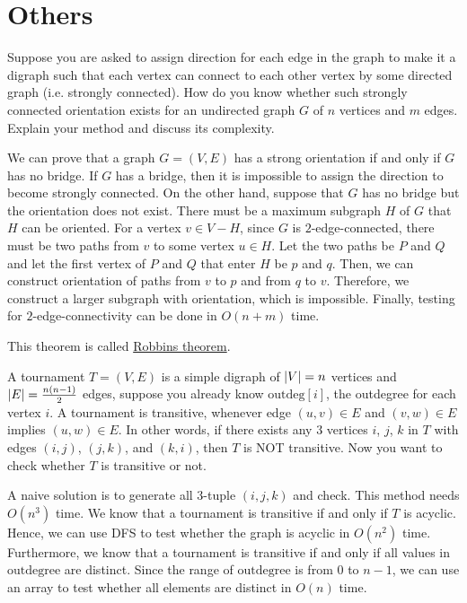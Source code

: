 \section{Others}
\begin{Exercise}[title={Strong orientation},origin={NCKU IM 99}]
Suppose you are asked to assign direction for each edge in the graph to make it a digraph such that each vertex can connect to each other vertex by some directed graph (i.e. strongly connected). How do you know whether such strongly connected orientation exists for an undirected graph $G$ of $n$ vertices and $m$ edges. Explain your method and discuss its complexity.
\end{Exercise}
\begin{Answer}
We can prove that a graph $G = (V, E)$ has a strong orientation if and only if $G$ has no bridge. If $G$ has a bridge, then it is impossible to assign the direction to become strongly connected. On the other hand, suppose that $G$ has no bridge but the orientation does not exist. There must be a maximum subgraph $H$ of $G$ that $H$ can be oriented. For a vertex $v \in V - H$, since $G$ is $2$-edge-connected, there must be two paths from $v$ to some vertex $u \in H$. Let the two paths be $P$ and $Q$ and let the first vertex of $P$ and $Q$ that enter $H$ be $p$ and $q$. Then, we can construct orientation of paths from $v$ to $p$ and from $q$ to $v$. Therefore, we construct a larger subgraph with orientation, which is impossible. Finally, testing for $2$-edge-connectivity can be done in $O(n + m)$ time.
\begin{remark} This theorem is called \href{https://en.wikipedia.org/wiki/Robbins%27_theorem}{Robbins theorem}.
\end{remark}
\end{Answer}

\begin{Exercise}[origin={NCKU CSIE 100}]
A tournament $T = (V, E)$ is a simple digraph of $\lvert V\rvert = n$ vertices and $\lvert E\rvert = \frac{n(n-1)}{2}$ edges, suppose you already know $\text{outdeg}[i]$, the outdegree for each vertex $i$. A tournament is transitive, whenever edge $(u, v) \in E$ and $(v, w) \in E$ implies $(u, w) \in E$. In other words, if there exists any $3$ vertices $i$, $j$, $k$ in $T$ with edges $(i, j)$, $(j, k)$, and $(k, i)$, then $T$ is NOT transitive. Now you want to check whether $T$ is transitive or not.
\end{Exercise}
\begin{Answer}
A naive solution is to generate all $3$-tuple $(i, j, k)$ and check. This method needs $O(n^3)$ time. We know that a tournament is transitive if and only if $T$ is acyclic. Hence, we can use DFS to test whether the graph is acyclic in $O(n^2)$ time. Furthermore, we know that a tournament is transitive if and only if all values in $\text{outdegree}$ are distinct. Since the range of $\text{outdegree}$ is from $0$ to $n-1$, we can use an array to test whether all elements are distinct in $O(n)$ time.
\end{Answer}


